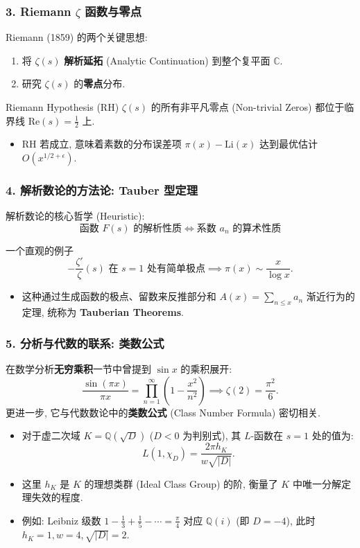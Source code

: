 \begin{frame}
\frametitle{3. Riemann $\zeta$ 函数与零点}
Riemann (1859) 的两个关键思想:
\begin{enumerate}
\item 将 $\zeta(s)$ \textbf{解析延拓} (Analytic Continuation) 到整个复平面 $\mathbb{C}$.
\item 研究 $\zeta(s)$ 的\textbf{零点}分布.
\end{enumerate}

\begin{alertblock}{Riemann Hypothesis (RH)}
$\zeta(s)$ 的所有非平凡零点 (Non-trivial Zeros) 都位于临界线 $\mathrm{Re}(s) = \frac{1}{2}$ 上.
\end{alertblock}

\begin{itemize}
\item RH 若成立, 意味着素数的分布误差项 $\pi(x) - \mathrm{Li}(x)$ 达到最优估计 $O(x^{1/2+\epsilon})$.
\end{itemize}
\end{frame}

\begin{frame}
\frametitle{4. 解析数论的方法论: Tauber 型定理}
解析数论的核心哲学 (Heuristic):
\[
\text{函数 } F(s) \text{ 的解析性质} \iff \text{系数 } a_n \text{ 的算术性质}
\]

\begin{exampleblock}{一个直观的例子}
\[
-\frac{\zeta'}{\zeta}(s) \text{ 在 } s=1 \text{ 处有简单极点} \implies \pi(x) \sim \frac{x}{\log x}.
\]
\end{exampleblock}

\begin{itemize}
    \item 这种通过生成函数的极点、留数来反推部分和 $A(x) = \sum_{n \le x} a_n$ 渐近行为的定理, 统称为 \textbf{Tauberian Theorems}.
\end{itemize}
\end{frame}

\begin{frame}
\frametitle{5. 分析与代数的联系: 类数公式}
在数学分析\textbf{无穷乘积}一节中曾提到 $\sin x$ 的乘积展开:
\[
\frac{\sin(\pi x)}{\pi x} = \prod_{n=1}^\infty \left( 1 - \frac{x^2}{n^2} \right) \implies \zeta(2) = \frac{\pi^2}{6}.
\]
更进一步, 它与代数数论中的\textbf{类数公式} (Class Number Formula) 密切相关.
\begin{itemize}
    \item 对于虚二次域 $K = \mathbb{Q}(\sqrt{D})$ ($D < 0$ 为判别式), 其 $L$-函数在 $s=1$ 处的值为:
    \[
    L(1, \chi_{D}) = \frac{2\pi h_K}{w \sqrt{|D|}}.
    \]
    \item 这里 $h_K$ 是 $K$ 的\alert{理想类群} (Ideal Class Group) 的阶, 衡量了 $K$ 中唯一分解定理失效的程度.
    \item 例如: Leibniz 级数 $1 - \frac{1}{3} + \frac{1}{5} - \cdots = \frac{\pi}{4}$ 对应 $\mathbb{Q}(i)$ (即 $D=-4$), 此时 $h_K=1, w=4, \sqrt{|D|}=2$.
\end{itemize}
\end{frame}

